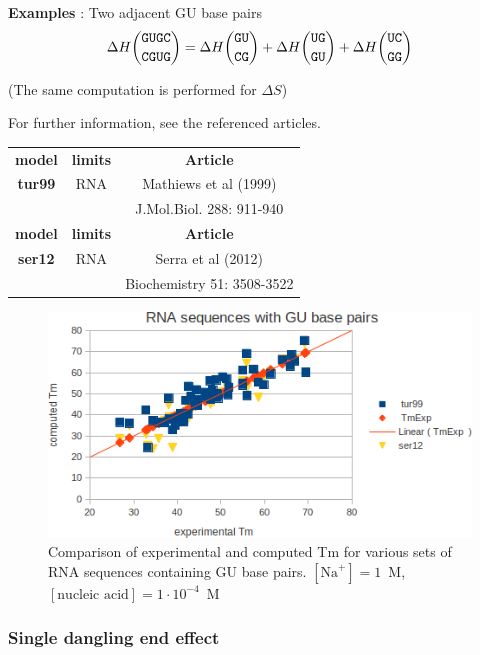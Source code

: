 \documentclass{article}
\begin{document}
\textbf{Examples} : Two adjacent GU base pairs
\begin{multline*}
\Delta H {\mbox{\texttt{GUGC}} \choose \mbox{\texttt{CGUG}}} = 
\Delta H {\mbox{\texttt{GU}} \choose \mbox{\texttt{CG}}} +
\Delta H {\mbox{\texttt{UG}} \choose \mbox{\texttt{GU}}} +
\Delta H {\mbox{\texttt{UC}} \choose \mbox{\texttt{GG}}}\\
\end{multline*}

       (The same computation is performed for $\Delta S$) 

       
For further information, see the referenced articles.

\begin{table}[hc]
\begin{tabular}[h]{| c | c | c |}
\hline
\textbf{model} & \textbf{limits} & \textbf{Article} \\
\textbf{tur99} & RNA & Mathiews et al (1999) \\
 & & J.Mol.Biol.  288: 911-940 \\
\hline
\hline
\textbf{model} & \textbf{limits} & \textbf{Article} \\
\textbf{ser12} & RNA & Serra et al (2012) \\
 & & Biochemistry  51: 3508-3522 \\
\hline
\end{tabular}
\end{table}

\begin{figure}[h]
\includegraphics[width=1\linewidth]{images/GUBasePairs}
\caption{Comparison of experimental and computed Tm for various sets of
 RNA sequences containing GU base pairs. $[\mbox{Na}^+] = 1$~M, $[\mbox{nucleic acid}] = 1\cdot{}10^{-4}$~M}
\end{figure}

\subsubsection{Single dangling end effect}
\end{document}
